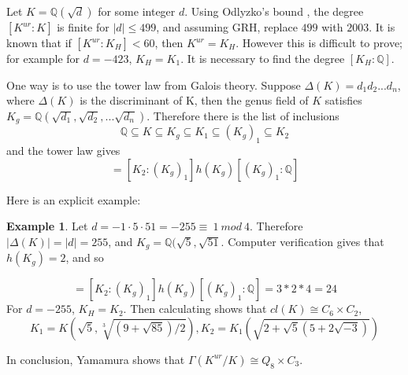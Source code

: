 \documentclass[12pt]{extarticle}
\newcommand{\murgg}{\Gamma(K^{ur}/K)}
\newcommand{\Q}{\mathbb{Q}}
\newcommand{\<}{\langle}
\renewcommand{\>}{\rangle}
\theoremstyle{definition}
\newtheorem{example}{Example}
\begin{document}
Let $K=\Q(\sqrt{d})$ for some integer $d$. Using Odlyzko's bound , the degree $[K^{ur}:K]$ is finite for $|d|\leq 499$, and assuming GRH, replace $499$ with $2003$. It is known that if $[K^{ur}:K_H]<60$, then $K^{ur}=K_H$. However this is difficult to prove; for example for $d=-423$, $K_H=K_1$. It is necessary to find the degree $[K_H:\Q]$. \par 
One way is to use the tower law from Galois theory. Suppose $\Delta(K)=d_1d_2...d_n$, where $\Delta(K)$ is the discriminant of K, then the genus field of $K$ satisfies $K_g=\Q(\sqrt{d_1},\sqrt{d_2},...\sqrt{d_n})$. Therefore there is the list of inclusions \begin{equation}
    \Q \subseteq K \subseteq K_g \subseteq K_1 \subseteq (K_g)_1 \subseteq K_2
\end{equation} and the tower law gives \begin{equation}
    [K_2:q] = [K_2:(K_g)_1]h(K_g)[(K_g)_1:\Q]
\end{equation}\par
Here is an explicit example:
\begin{example}
 Let $d=-1 \cdot 5 \cdot 51=-255\equiv \: 1\:mod\:4$. Therefore $|\Delta(K)|=|d|=255$, and $K_g = \Q(\sqrt{5},\sqrt{51}$. Computer verification gives that $h(K_g)=2$, and so 

\begin{equation}
     [K_2:\Q] = [K_2:(K_g)_1]h(K_g)[(K_g)_1:\Q]= 3*2*4=24
\end{equation}
For $d=-255$, $K_H=K_2$. Then calculating shows that $cl(K)\cong C_6 \times C_2$, 
\begin{equation}
K_1 = K \left( 
\sqrt{5}, \sqrt[3]{(9+\sqrt{85})/2}
\right), K_2 = K_1 \left( 
\sqrt{2+\sqrt{5}(5+2\sqrt{-3})}
\right)
\end{equation}


 In conclusion, Yamamura shows that $\murgg \cong Q_8 \times C_3$.
\end{example}
\end{document}
